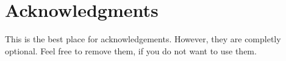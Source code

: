 \chapter*{Acknowledgments}

This is the best place for acknowledgements. However, they are completly optional. Feel free to remove them, if you do not want to use them.
